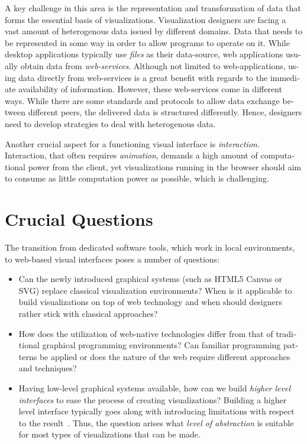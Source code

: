 \begin{english}
A key challenge in this area is the representation and transformation of data that forms the essential basis of visualizations. Visualization designers are facing a vast amount of heterogenous data issued by different domains. Data that needs to be represented in some way in order to allow programs to operate on it. While desktop applications typically use \emph{files} as their data-source, web applications usually obtain data from \emph{web-services}. Although not limited to web-applications, using data directly from web-services is a great benefit with regards to the immediate availability of information. However, these web-services come in different ways. While there are some standards and protocols to allow data exchange between different peers, the delivered data is structured differently. Hence, designers need to develop strategies to deal with heterogenous data.

Another crucial aspect for a functioning visual interface is \emph{interaction}. Interaction, that often requires \emph{animation}, demands a high amount of computational power from the client, yet visualizations running in the browser should aim to consume as little computation power as possible, which is challenging.

\section{Crucial Questions}

The transition from dedicated software tools, which work in local environments, to web-based visual interfaces poses a number of questions:

\begin{itemize}
  \item Can the newly introduced graphical systems (such as HTML5 Canvas or SVG) replace classical visualization environments? When is it applicable to build visualizations on top of web technology and when should designers rather stick with classical approaches?
  
  \item How does the utilization of web-native technologies differ from that of traditional graphical programming environments? Can familiar programming patterns be applied or does the nature of the web require different approaches and techniques?
  
  \item Having low-level graphical systems available, how can we build \emph{higher level interfaces} to ease the process of creating visualizations? Building a higher level interface typically goes along with introducing limitations with respect to the result~\cite{Protovis09}. Thus, the question arises what \emph{level of abstraction} is suitable for most types of visualizations that can be made.
  

\end{itemize}
\end{english}
